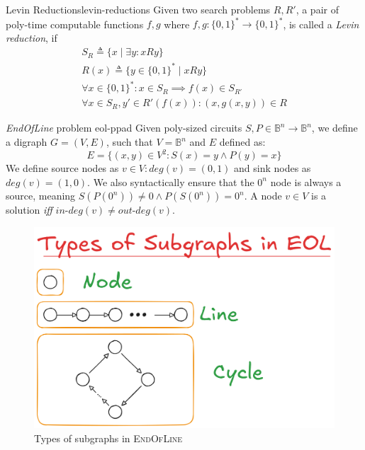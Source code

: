 \begin{definitionbox}{Levin Reductions}{levin-reductions}
    \label{def:levin-reductions}
    Given two search problems $R,R'$, 
    a pair of poly-time computable functions \(f,g\) where \(f,g: \{0,1\}^* \to \{0,1\}^*\), is
    called a \textit{Levin reduction}, if
    \begin{gather*}
        S_R \triangleq \{x \mid \exists y : xRy\} \\
        R(x) \triangleq \{y \in \{0,1\}^* \mid xRy\} \\
        \forall x \in \{0,1\}^*: x \in  S_R \implies f(x) \in S_{R'}\\
        \forall x \in S_R, y' \in R'(f(x)): (x,g(x,y)) \in R
    \end{gather*}
\end{definitionbox}

\begin{definitionbox}{\textit{EndOfLine} problem \cite{papadimitriou_ComplexityParityArgument_1994}}{eol-ppad}
    Given poly-sized circuits $S, P \in \mathbb{B}^n \to \mathbb{B}^n$,
    we define a digraph $G = (V,E)$, such that $V= \mathbb{B}^n$ and $E$ defined as:
    $$
        E = \{(x,y) \in V^2: S(x) = y \wedge P(y) = x\}
    $$
    We define source nodes as $v \in V: \textit{deg}(v) = (0,1)$  and sink nodes as
    $\textit{deg}(v) = (1,0)$.
    We also syntactically ensure that the $0^n$ node is always a source, meaning
    $S(P(0^n)) \neq 0 \wedge P(S(0^n)) = 0^n$.
    A node $v \in V$ is a solution \textit{iff} $\textit{in-deg}(v) \neq \textit{out-deg}(v)$.
\end{definitionbox}

\begin{figure}
    \centering
    \includegraphics[width=0.7\linewidth]{assets/eol-subgraphs.png}
    \caption{Types of subgraphs in \textsc{EndOfLine}}
    \label{fig:eol-subgraphs}
\end{figure}

